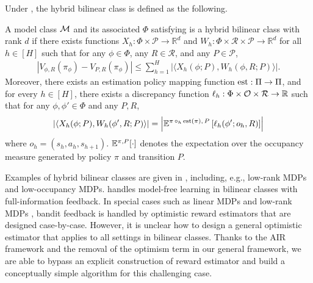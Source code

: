 Under , the hybrid bilinear class is defined as the following. 
\begin{assumption}
\label{assum:hybrid bilinear}
A model class $\mathcal{M}$ and its associated $\Phi$ satisfying  is a hybrid bilinear class with rank $d$ if there exists functions $X_h: \Phi \times \mathcal{P} \rightarrow \mathbb{R}^d$ and  $W_h: \Phi \times \mathcal{R} \times \mathcal{P} \rightarrow \mathbb{R}^d$ for all $h\in[H]$ such that for any $\phi \in \Phi$, any $R \in \mathcal{R}$, and any $ P \in \mathcal{P}$, 
    \begin{align*}
        \left|V_{\phi, R}(\pi_\phi) - V_{P, R}(\pi_\phi)\right| \leq \sum_{h=1}^H \left|\langle X_h(\phi; P), W_h(\phi, R; P)\rangle\right|.
    \end{align*}
    Moreover, there exists an estimation policy mapping function $\operatorname*{est}: \Pi \rightarrow \Pi$, and for every $h \in [H]$, there exists a discrepancy function $\ell_h: \Phi \times \mathcal{O} \times \mathcal{R}  \rightarrow \mathbb{R}$ such that for any $\phi, \phi'\in\Phi$ and any $P,R$, 
    \begin{align*}
        \left|\langle X_h(\phi; P), W_h(\phi', R; P) \rangle\right| = \left|\mathbb{E}^{\pi \,\circ_h\, \operatorname*{est}(\pi),\, P} \left[\ell_h(\phi'; o_h, R)\right]\right|
    \end{align*}
    where $o_h = (s_h,a_h,s_{h+1})$. $\mathbb{E}^{\pi, P}[\cdot]$ denotes the expectation over the occupancy measure generated by policy $\pi$ and transition $P$. %
\end{assumption}
Examples of hybrid bilinear classes are given in \cite{liu2025decision}, including, e.g., low-rank MDPs and low-occupancy MDPs. \cite{liu2025decision} handles model-free learning in bilinear classes with full-information feedback.  
In special cases such as linear MDPs \cite{liu2023towards} and low-rank MDPs \cite{liu2024beating}, bandit feedback is handled by optimistic reward estimators that are designed case-by-case. However, it is unclear how to design a general optimistic estimator that applies to all settings in bilinear classes. Thanks to the AIR framework \cite{xu2023bayesian} and the removal of the optimism term in our general framework, we are able to bypass an explicit construction of reward estimator and build a conceptually simple algorithm for this challenging case.  

